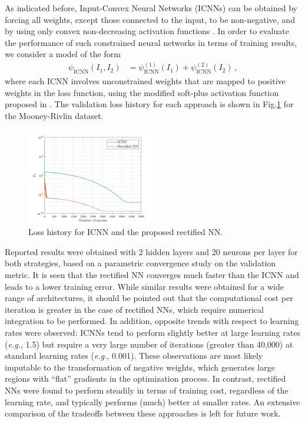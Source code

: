 \begin{remark} As indicated before, Input-Convex Neural Networks (ICNNs) can be obtained by forcing all weights, except those connected to the input, to be non-negative, and by using only convex non-decreasing activation functions \cite{amos2017input, as2022mechanics,Asad-IJNME,KLEIN2022104703}. In order to evaluate the performance of such constrained neural networks in terms of training results, we consider a model of the form 
\begin{align}
    \psi_{\mathrm{ICNN}}(I_1, I_2) &= \psi_{\mathrm{ICNN}}^{(1)}(I_1) + \psi_{\mathrm{ICNN}}^{(2)}(I_2)\,,
\end{align}
where each ICNN involves unconstrained weights that are mapped to positive weights in the loss function, using the modified soft-plus activation function proposed in \cite{as2022mechanics,Asad-IJNME}. The validation loss history for each approach is shown in Fig.\ref{fig:ERR_history} for the Mooney-Rivlin dataset.
\begin{figure}[ht!]
    \begin{center}
        \includegraphics[width = 0.5\textwidth]{Pictures/loss_hist.png}
    \end{center}
    \caption[Loss history for ICNN and the proposed rectified NN.]{Loss history for ICNN and the proposed rectified NN.}
    \label{fig:ERR_history} 
\end{figure}
Reported results were obtained with 2 hidden layers and 20 neurons per layer for both strategies, based on a parametric convergence study on the validation metric. It is seen that the rectified NN converges much faster than the ICNN and leads to a lower training error. While similar results were obtained for a wide range of architectures, it should be pointed out that the computational cost per iteration is greater in the case of rectified NNs, which require numerical integration to be performed. In addition, opposite trends with respect to learning rates were observed: ICNNs tend to perform slightly better at large learning rates (\textit{e.g.}, 1.5) but require a very large number of iterations (greater than 40,000) at standard learning rates (\textit{e.g.}, 0.001). These observations are most likely imputable to the transformation of negative weights, which generates large regions with ``flat'' gradients in the optimization process. In contrast, rectified NNs were found to perform steadily in terms of training cost, regardless of the learning rate, and typically performs (much) better at smaller rates. An extensive comparison of the tradeoffs between these approaches is left for future work.
\end{remark}

